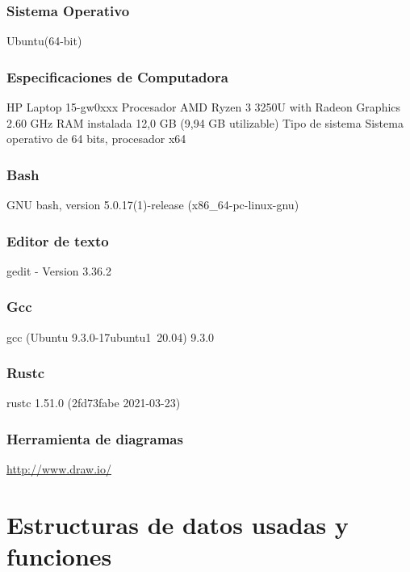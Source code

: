\documentclass[a4paper,12pt,twoside]{article}
\begin{document}
\subsubsection{Sistema Operativo}
Ubuntu(64-bit)
\subsubsection{Especificaciones de Computadora}
\bigbreak HP Laptop 15-gw0xxx
\bigbreak Procesador AMD Ryzen 3 3250U with Radeon Graphics 2.60 GHz
\bigbreak RAM instalada	12,0 GB (9,94 GB utilizable)
\bigbreak Tipo de sistema	Sistema operativo de 64 bits, procesador x64
\subsubsection{Bash}
GNU bash, version 5.0.17(1)-release (x86_64-pc-linux-gnu)
\subsubsection{Editor de texto}
gedit - Version 3.36.2
\subsubsection{Gcc}
gcc (Ubuntu 9.3.0-17ubuntu1~20.04) 9.3.0
\subsubsection{Rustc}
rustc 1.51.0 (2fd73fabe 2021-03-23)
\subsubsection{Herramienta de diagramas}
\url{http://www.draw.io/}

\newpage
\section{Estructuras de datos usadas y funciones}
\end{document}
